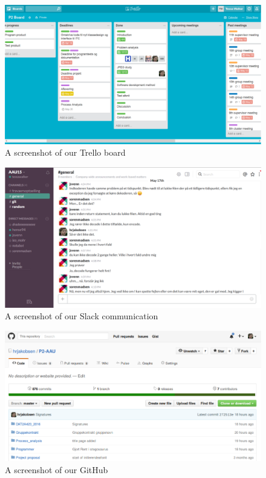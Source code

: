\documentclass{article}
\begin{document}
\begin{figure}
	\centering
	\includegraphics[width=1 \textwidth]{figures/trello.png}
	\caption{A screenshot of our Trello board}
	\label{fig:trello}
\end{figure}

\begin{figure}
	\centering
	\includegraphics[width=1 \textwidth]{figures/slack.png}
	\caption{A screenshot of our Slack communication}
	\label{fig:slack}
\end{figure}

\begin{figure}
	\centering
	\includegraphics[width=1 \textwidth]{figures/git.png}
	\caption{A screenshot of our GitHub}
	\label{fig:git}
\end{figure}
\end{document}
